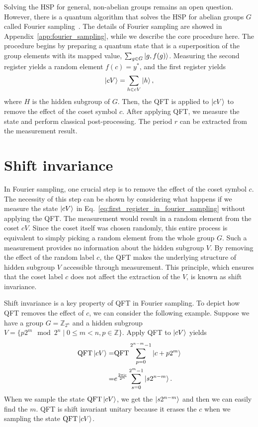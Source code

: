 \documentclass[aps,reprint,showpacs,tightenlines, twocolumn]{revtex4-2}
\newcommand{\ii}{\mathsf{i}}
\newcommand{\ZZ}{\mathbb{Z}}
\newcommand{\qft}{\text{QFT}}
\begin{document}
Solving the HSP for general, non-abelian groups remains an open question. However, there is a quantum algorithm that solves the HSP for abelian groups $G$ called Fourier sampling~\cite{hallgren2003hidden, lomont2004hidden}. The details of Fourier sampling are showed in Appendix~\ref{app:fourier_sampling}, while we describe the core procedure here. The procedure begins by preparing a quantum state that is a superposition of the group elements with its mapped value, $\sum_{g \in G}\ket{g, f(g)}$. Measuring the second register yields a random element $f(c) = y^\ast$, and the first register yields
\begin{equation}
	\ket{cV} = \sum_{h \in cV}\ket{h},
	\label{eq:first_register_in_fourier_sampling}
\end{equation}
where $H$ is the hidden subgroup of $G$.
Then, the QFT is applied to $\ket{cV}$ to remove the effect of the coset symbol $c$. After applying QFT, we measure the state and perform classical post-processing. The period $r$ can be extracted from the measurement result.

\section{Shift invariance}
\label{sec:shift_invariance}
In Fourier sampling, one crucial step is to remove the effect of the coset symbol $c$.
The necessity of this step can be shown by considering what happens if we measure the state $\ket{cV}$ in Eq.~\ref{eq:first_register_in_fourier_sampling} without applying the QFT. The measurement would result in a random element from the coset $cV$. Since the coset itself was chosen randomly, this entire process is equivalent to simply picking a random element from the whole group $G$. Such a measurement provides no information about the hidden subgroup $V$. By removing the effect of the random label $c$, the QFT makes the underlying structure of hidden subgroup $V$ accessible through measurement. This principle, which ensures that the coset label
$c$ does not affect the extraction of the $V$, is known as shift invariance.

Shift invariance is a key property of QFT in Fourier sampling. To depict how QFT removes the effect of $c$, we can consider the following example. Suppose we have a group $G = \ZZ_{2^n}$ and a hidden subgroup $V = \{p 2^m \mod 2^n \mid 0\leq m<n,p \in \ZZ \}$. Apply QFT to $\ket{cV}$ yields
\begin{align}
	\qft\ket{cV} =& \qft\sum_{p =0}^{2^{n-m}-1}\ket{c+ p 2^m} \\
	=& e^{\frac{2\pi \ii c}{2^n}  } \sum_{s =0}^{2^m-1} \ket{s 2^{n-m}}.
\end{align}
When we sample the state $\qft \ket{cV}$, we get the $\ket{s 2^{n-m}}$ and then we can easily find the $m$. QFT is shift invariant unitary because it erases the $c$ when we sampling the state $\qft \ket{cV}$.
\end{document}
